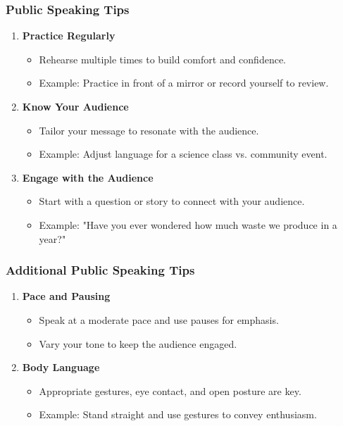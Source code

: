 \documentclass[aspectratio=169]{beamer}
\begin{document}
\begin{frame}[fragile]
    \frametitle{Public Speaking Tips}
    \begin{enumerate}
        \item \textbf{Practice Regularly}
            \begin{itemize}
                \item Rehearse multiple times to build comfort and confidence.
                \item Example: Practice in front of a mirror or record yourself to review.
            \end{itemize}
        \item \textbf{Know Your Audience}
            \begin{itemize}
                \item Tailor your message to resonate with the audience.
                \item Example: Adjust language for a science class vs. community event.
            \end{itemize}
        \item \textbf{Engage with the Audience}
            \begin{itemize}
                \item Start with a question or story to connect with your audience.
                \item Example: "Have you ever wondered how much waste we produce in a year?"
            \end{itemize}
    \end{enumerate}
\end{frame}

\begin{frame}[fragile]
    \frametitle{Additional Public Speaking Tips}
    \begin{enumerate}[resume]
        \item \textbf{Pace and Pausing}
            \begin{itemize}
                \item Speak at a moderate pace and use pauses for emphasis.
                \item Vary your tone to keep the audience engaged.
            \end{itemize}
        \item \textbf{Body Language}
            \begin{itemize}
                \item Appropriate gestures, eye contact, and open posture are key.
                \item Example: Stand straight and use gestures to convey enthusiasm.
            \end{itemize}
    \end{enumerate}
\end{frame}
\end{document}
